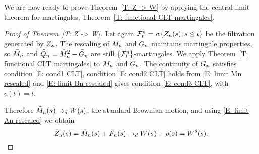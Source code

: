 We are now ready to prove Theorem~\ref{T: Z -> W} by applying the central limit theorem for martingales, Theorem~\ref{T: functional CLT martingales}.

\begin{proof}[Proof of Theorem~\ref{T: Z -> W}]
	Let again $\mathcal{F}^n_{t} = \sigma \{ Z_n(s), s \leq t \}$ be the filtration generated by $Z_n$.
	The rescaling of $M_n$ and $G_n$ maintains martingale properties,
	so $\bar{M}_n$ and $\bar{Q}_n = \bar{M}_n^2 - \bar{G}_n$ are still $\{\mathcal{F}^n_{t}\}$-martingales.
	We apply Theorem~\ref{T: functional CLT martingales} to $\bar{M}_n$ and $\bar{G}_n$.
	The continuity of $\bar{G}_n$ satisfies condition \eqref{E: cond1 CLT}, 
	condition \eqref{E: cond2 CLT} holds from \eqref{E: limit Mn rescaled}
	and \eqref{E: limit Bn rescaled} gives condition \eqref{E: cond3 CLT}, with $c(t) = t$.
	
	Therefore $\bar{M}_n(s) \rightarrow_d W(s)$, the standard Brownian motion, and using \eqref{E: limit An rescaled} we obtain
	\begin{equation}
	\bar{Z}_n(s) = \bar{M}_n(s) + \bar{F}_n(s) \rightarrow_d W(s) + \rho (s) = W^{\theta}(s).
	\end{equation}
\end{proof}

